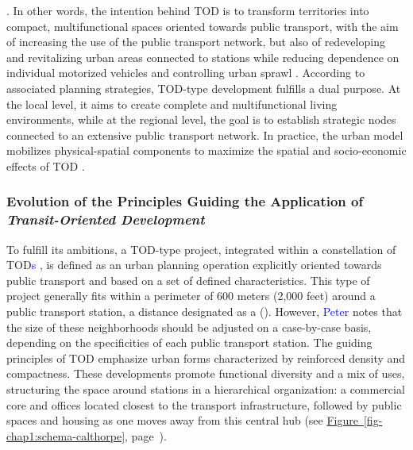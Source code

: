 \begin{refsegment}
{} \textcolor{blue}{\autocite[56]{calthorpe_next_1993}}. In other words, the intention behind \acrshort{TOD} is to transform territories into compact, multifunctional spaces oriented towards public transport, with the aim of increasing the use of the public transport network, but also of redeveloping and revitalizing urban areas connected to stations while reducing dependence on individual motorized vehicles and controlling urban sprawl \textcolor{blue}{\autocites[19]{carlton_histories_2007}[7]{tcrp_effects_2008}[112]{almeida_correia_transit-oriented_2020}}. According to associated planning strategies, \acrshort{TOD}-type development fulfills a dual purpose. At the local level, it aims to create complete and multifunctional living environments, while at the regional level, the goal is to establish strategic nodes connected to an extensive public transport network. In practice, the urban model mobilizes physical-spatial components to maximize the spatial and socio-economic effects of \acrshort{TOD} \textcolor{blue}{\autocite[39]{conesa_modelisation_2010}}.%

\subsubsection*{Evolution of the Principles Guiding the Application of \textsl{Transit-Oriented Development}
    \label{chap1:tod-presentation-generale-definition-principes}
    }

To fulfill its ambitions, a \acrshort{TOD}-type project, integrated within a constellation of \acrshort{TOD}\textcolor{blue}{s} \textcolor{blue}{\autocite[42, 56]{calthorpe_next_1993}}, is defined as an urban planning operation explicitly oriented towards public transport and based on a set of defined characteristics. This type of project generally fits within a perimeter of 600 meters (2,000 feet) around a public transport station, a distance designated as a  (). However, \textcolor{blue}{Peter} \textcolor{blue}{\textcite[56]{calthorpe_next_1993}} notes that the size of these neighborhoods should be adjusted on a case-by-case basis, depending on the specificities of each public transport station. The guiding principles of \acrshort{TOD} emphasize urban forms characterized by reinforced density and compactness. These developments promote functional diversity and a mix of uses, structuring the space around stations in a hierarchical organization: a commercial core and offices located closest to the transport infrastructure, followed by public spaces and housing as one moves away from this central hub (see \hyperref[fig-chap1:schema-calthorpe]{Figure~\ref{fig-chap1:schema-calthorpe}}, page~\pageref{fig-chap1:schema-calthorpe}).%


\end{refsegment}
